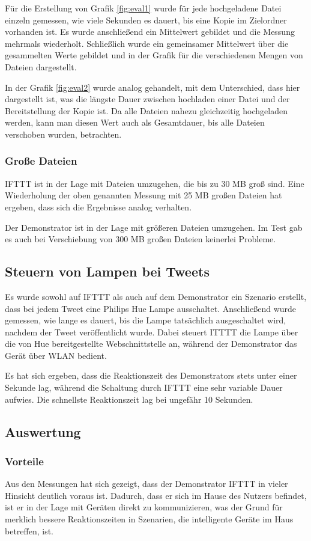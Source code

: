 Für die Erstellung von Grafik \ref{fig:eval1} wurde für jede hochgeladene Datei einzeln gemessen, wie viele Sekunden es dauert, bis eine Kopie im Zielordner vorhanden ist. Es wurde anschließend ein Mittelwert gebildet und die Messung mehrmals wiederholt. Schließlich wurde ein gemeinsamer Mittelwert über die gesammelten Werte gebildet und in der Grafik für die verschiedenen Mengen von Dateien dargestellt.

In der Grafik \ref{fig:eval2} wurde analog gehandelt, mit dem Unterschied, dass hier dargestellt ist, was die längste Dauer zwischen hochladen einer Datei und der Bereitstellung der Kopie ist. Da alle Dateien nahezu gleichzeitig hochgeladen werden, kann man diesen Wert auch als Gesamtdauer, bis alle Dateien verschoben wurden, betrachten.

\subsubsection{Große Dateien}
IFTTT ist in der Lage mit Dateien umzugehen, die bis zu 30 MB groß sind. Eine Wiederholung der oben genannten Messung mit 25 MB großen Dateien hat ergeben, dass sich die Ergebnisse  analog verhalten. 

Der Demonstrator ist in der Lage mit größeren Dateien umzugehen. Im Test gab es auch bei Verschiebung von 300 MB großen Dateien keinerlei Probleme.

\subsection{Steuern von Lampen bei Tweets}
Es wurde sowohl auf IFTTT als auch auf dem Demonstrator ein Szenario erstellt, dass bei jedem Tweet eine Philips Hue Lampe ausschaltet. Anschließend wurde gemessen, wie lange es dauert, bis die Lampe tatsächlich ausgeschaltet wird, nachdem der Tweet veröffentlicht wurde. Dabei steuert ITTTT die Lampe über die von Hue bereitgestellte Webschnittstelle an, während der Demonstrator das Gerät über WLAN bedient.

Es hat sich ergeben, dass die Reaktionszeit des Demonstrators stets unter einer Sekunde lag, während die Schaltung durch IFTTT eine sehr variable Dauer aufwies. Die schnellste Reaktionszeit lag bei ungefähr 10 Sekunden.


\subsection{Auswertung}
\subsubsection{Vorteile}
Aus den Messungen hat sich gezeigt, dass der Demonstrator IFTTT in vieler Hinsicht deutlich voraus ist. Dadurch, dass er sich im Hause des Nutzers befindet, ist er in der Lage mit Geräten direkt zu kommunizieren, was der Grund für merklich bessere Reaktionszeiten in Szenarien, die intelligente Geräte im Haus betreffen, ist.\\

